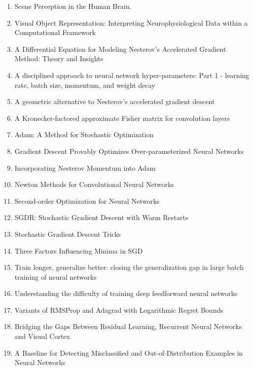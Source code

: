 \documentclass[acmlarge]{acmart}
\begin{document}
\begin{enumerate}
	\item Scene Perception in the Human Brain. \cite{Epstein2019ScenePI}
	\item Visual Object Representation: Interpreting Neurophysiological Data within a Computational Framework \cite{Plaut1990VisualOR}
	\item A Differential Equation for Modeling Nesterov's Accelerated Gradient Method: Theory and Insights \cite{Su2014ADE}
	\item A disciplined approach to neural network hyper-parameters: Part 1 - learning rate, batch size, momentum, and weight decay \cite{Smith2018ADA}
	\item A geometric alternative to Nesterov's accelerated gradient descent \cite{Bubeck2015AGA}
	\item A Kronecker-factored approximate Fisher matrix for convolution layers \cite{Grosse2016AKA}
	\item Adam: A Method for Stochastic Optimization \cite{kingma2014adam}
	\item Gradient Descent Provably Optimizes Over-parameterized Neural Networks \cite{Du2019GradientDP}
	\item Incorporating Nesterov Momentum into Adam \cite{Dozat2016IncorporatingNM}
	\item Newton Methods for Convolutional Neural Networks \cite{Wang2020NewtonMF}
	\item Second-order Optimization for Neural Networks \cite{Martens2016SecondorderOF}
	\item SGDR: Stochastic Gradient Descent with Warm Restarts \cite{Loshchilov2017SGDRSG}
	\item Stochastic Gradient Descent Tricks \cite{Bottou2012StochasticGD}
	\item Three Factors Influencing Minima in SGD \cite{Jastrzebski2017ThreeFI}
	\item Train longer, generalize better: closing the generalization gap in large batch training of neural networks \cite{Hoffer2017TrainLG}
	\item Understanding the difficulty of training deep feedforward neural networks \cite{Glorot2010UnderstandingTD}
	\item Variants of RMSProp and Adagrad with Logarithmic Regret Bounds \cite{Mukkamala2017VariantsOR}
	\item Bridging the Gaps Between Residual Learning, Recurrent Neural Networks and Visual Cortex \cite{Liao2016BridgingTG}
	\item A Baseline for Detecting Misclassified and Out-of-Distribution Examples in Neural Networks \cite{Hendrycks2017ABF}

\end{enumerate}
\end{document}
